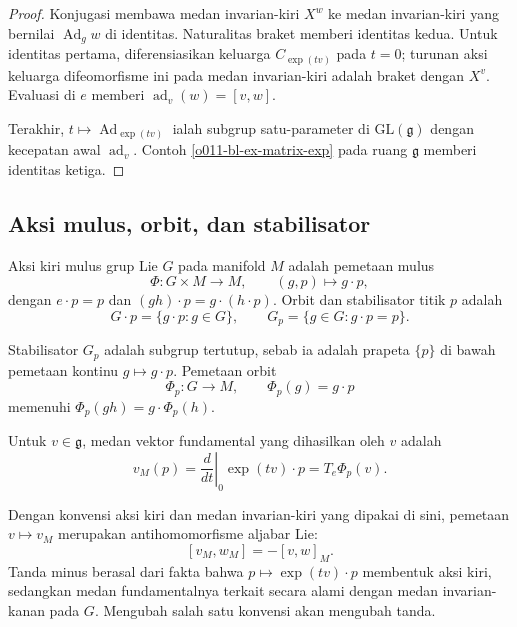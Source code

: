 \begin{proof}
Konjugasi membawa medan invarian-kiri $X^w$ ke medan invarian-kiri yang
bernilai $\operatorname{Ad}_g w$ di identitas. Naturalitas braket memberi
identitas kedua. Untuk identitas pertama, diferensiasikan keluarga
$C_{\exp(tv)}$ pada $t=0$; turunan aksi keluarga difeomorfisme ini pada medan
invarian-kiri adalah braket dengan $X^v$. Evaluasi di $e$ memberi
$\operatorname{ad}_v(w)=[v,w]$.

Terakhir, $t\mapsto\operatorname{Ad}_{\exp(tv)}$ ialah subgrup satu-parameter
di $\mathrm{GL}(\mathfrak g)$ dengan kecepatan awal
$\operatorname{ad}_v$. Contoh \ref{o011-bl-ex-matrix-exp} pada ruang
$\mathfrak g$ memberi identitas ketiga.
\end{proof}

\subsection{Aksi mulus, orbit, dan stabilisator}

\begin{definition}\label{o011-bl-def-action}
Aksi kiri mulus grup Lie $G$ pada manifold $M$ adalah pemetaan mulus
\[
  \Phi\colon G\times M\longrightarrow M,
  \qquad (g,p)\longmapsto g\cdot p,
\]
dengan $e\cdot p=p$ dan $(gh)\cdot p=g\cdot(h\cdot p)$.
Orbit dan stabilisator titik $p$ adalah
\[
  G\cdot p=\{g\cdot p:g\in G\},
  \qquad
  G_p=\{g\in G:g\cdot p=p\}.
\]
\end{definition}

Stabilisator $G_p$ adalah subgrup tertutup, sebab ia adalah prapeta
$\{p\}$ di bawah pemetaan kontinu $g\mapsto g\cdot p$. Pemetaan orbit
\[
  \Phi_p\colon G\longrightarrow M,
  \qquad \Phi_p(g)=g\cdot p
\]
memenuhi $\Phi_p(gh)=g\cdot\Phi_p(h)$.

\begin{definition}\label{o011-bl-def-fundamental-field}
Untuk $v\in\mathfrak g$, medan vektor fundamental yang dihasilkan oleh $v$
adalah
\[
  v_M(p)=\left.\frac{d}{dt}\right|_{0}\exp(tv)\cdot p
  =T_e\Phi_p(v).
\]
\end{definition}

Dengan konvensi aksi kiri dan medan invarian-kiri yang dipakai di sini,
pemetaan $v\mapsto v_M$ merupakan antihomomorfisme aljabar Lie:
\[
  [v_M,w_M]=-[v,w]_M.
\]
Tanda minus berasal dari fakta bahwa $p\mapsto\exp(tv)\cdot p$ membentuk
aksi kiri, sedangkan medan fundamentalnya terkait secara alami dengan medan
invarian-kanan pada $G$. Mengubah salah satu konvensi akan mengubah tanda.

